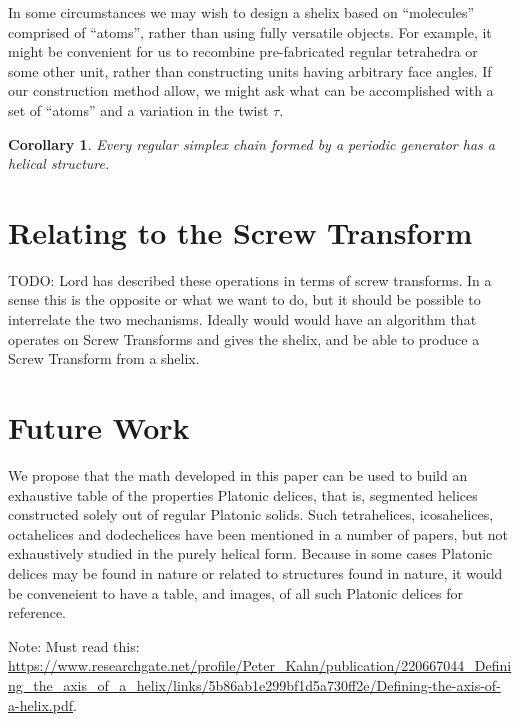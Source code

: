 \documentclass[11pt]{article}
\newtheorem{corollary}{Corollary}
\begin{document}
{In some circumstances we may wish to design a shelix based on ``molecules'' comprised of ``atoms'',
rather than using fully versatile objects. For example, it might be convenient for us to
recombine pre-fabricated regular tetrahedra or some other unit, rather than constructing
units having arbitrary face angles. If our construction method allow, we might ask
what can be accomplished with a set of ``atoms'' and a variation in the twist $\tau$\cite{elgersma2016quadrahelix}.

\begin{corollary}
  Every regular simplex chain formed by a periodic generator has a helical structure.
  \end{corollary}

\section{Relating to the Screw Transform}

TODO: Lord has described these operations in terms of screw transforms. In a sense this is the opposite or what we want to do, but it should be possible to interrelate
the two mechanisms. Ideally would would have an algorithm that operates on Screw Transforms and gives the shelix, and be able to produce a Screw Transform
from a shelix.

\section{Future Work}

We propose that the math developed in this paper can be used to build an exhaustive table of the properties {Platonic delices},
that is, segmented helices constructed solely out of regular Platonic solids. Such tetrahelices, icosahelices, octahelices and dodechelices
have been mentioned in a number of papers\cite{elgersma2016quadrahelix,babiker2012combinatorial,lord2001sphere}, but not exhaustively studied in the purely helical form. Because in some cases Platonic delices may be found in nature or related to structures found in nature\cite{lord2004gamma},
it would be conveneient to have a table, and images, of all such Platonic delices for reference.



Note: Must read this: \url{https://www.researchgate.net/profile/Peter_Kahn/publication/220667044_Defining_the_axis_of_a_helix/links/5b86ab1e299bf1d5a730ff2e/Defining-the-axis-of-a-helix.pdf}\cite{kahn1989defining}.

}
\end{document}
